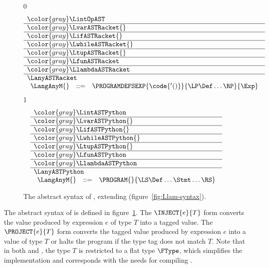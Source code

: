 \documentclass[7x10]{TimesAPriori_MIT}%
\newcommand{\gray}[1]{{\color{gray} #1}}
\def\racketEd{0}
\def\pythonEd{1}
\def\edition{0}
\newcommand{\racket}[1]{{\if\edition\racketEd{#1}\fi}}
\numberwithin{theorem}{chapter}
\numberwithin{definition}{chapter}
\numberwithin{equation}{chapter}
\begin{document}
\begin{figure}[tp]
\centering
\begin{tcolorbox}[colback=white]
    \small
{\if\edition\racketEd
\[
\begin{array}{l}
  \gray{\LintOpAST} \\ \hline
  \gray{\LvarASTRacket{}} \\ \hline
  \gray{\LifASTRacket{}} \\ \hline
  \gray{\LwhileASTRacket{}} \\ \hline
  \gray{\LtupASTRacket{}} \\ \hline
  \gray{\LfunASTRacket} \\ \hline
  \gray{\LlambdaASTRacket} \\ \hline
  \LanyASTRacket \\
\begin{array}{lcl}
  \LangAnyM{} &::=& \PROGRAMDEFSEXP{\code{'()}}{\LP\Def\ldots\RP}{\Exp}
\end{array}
\end{array}
\]
\fi}
{\if\edition\pythonEd
\[
\begin{array}{l}
  \gray{\LintASTPython} \\ \hline
  \gray{\LvarASTPython{}} \\ \hline
  \gray{\LifASTPython{}} \\ \hline
  \gray{\LwhileASTPython{}} \\ \hline
  \gray{\LtupASTPython{}} \\ \hline
  \gray{\LfunASTPython} \\ \hline
  \gray{\LlambdaASTPython} \\ \hline
  \LanyASTPython \\
  \begin{array}{lcl}
  \LangAnyM{} &::=& \PROGRAM{}{\LS \Def \ldots \Stmt \ldots \RS}
  \end{array}
\end{array}
\]
\fi}
\end{tcolorbox}

\caption{The abstract syntax of \LangAny{}, extending \LangLam{} (figure~\ref{fig:Llam-syntax}).}
\label{fig:Lany-syntax}
\end{figure}

The abstract syntax of \LangAny{} is defined in figure~\ref{fig:Lany-syntax}.
The $\INJECT{e}{T}$ form
converts the value produced by expression $e$ of type $T$ into a
tagged value.  The $\PROJECT{e}{T}$ form converts the tagged value
produced by expression $e$ into a value of type $T$ or halts the
program if the type tag does not match $T$.
%
Note that in both  and , the type $T$ is
restricted to a flat type $\FType$, which simplifies the
implementation and corresponds with the needs for compiling \LangDyn{}.
\end{document}
